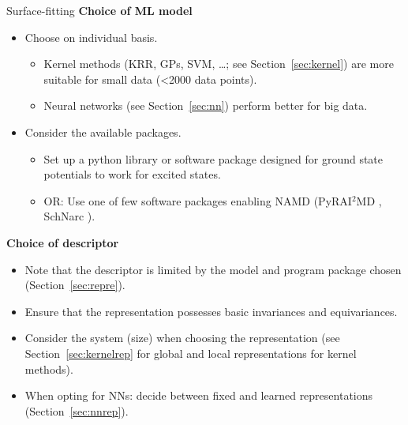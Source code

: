 \documentclass[9pt,bestpractices]{livecoms}
\begin{document}
\begin{Checklists*}[p!]
\begin{checklist}{Surface-fitting}
\textbf{Choice of ML model}
\begin{itemize}
\item Choose on individual basis.
\begin{itemize}
    \item Kernel methods (KRR, GPs, SVM, \dots; see Section~\ref{sec:kernel}) are more suitable for small data (<2000 data points).
    \item Neural networks (see Section~\ref{sec:nn}) perform better for big data.
\end{itemize}
\item Consider the available packages.
\begin{itemize}
    \item Set up a python library or software package designed for ground state potentials to work for excited states.
    \item OR: Use one of few software packages enabling NAMD (PyRAI$^2$MD \cite{RN121}, SchNarc \cite{RN103,RN142}).
\end{itemize}
\end{itemize}

\textbf{Choice of descriptor}
\begin{itemize}
\item Note that the descriptor is limited by the model and program package chosen (Section~\ref{sec:repre}).
\item Ensure that the representation possesses basic invariances and equivariances.
\item Consider the system (size) when choosing the representation (see Section~\ref{sec:kernelrep} for global and local representations for kernel methods).
\item When opting for NNs: decide between fixed and learned representations (Section~\ref{sec:nnrep}).
\end{itemize}

\end{checklist}
\end{Checklists*}
\end{document}
